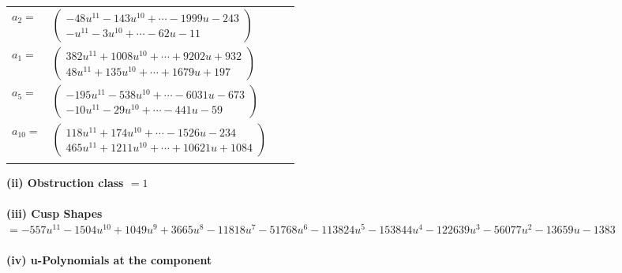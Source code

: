 \documentclass[1p]{elsarticle_modified}
\theoremstyle{definition}
\begin{document}
\begin{tabular}{m{7pt} m{180pt} m{7pt} m{180pt} }
\flushright $a_{2}=$&$\begin{pmatrix}-48 u^{11}-143 u^{10}+\cdots-1999 u-243\\- u^{11}-3 u^{10}+\cdots-62 u-11\end{pmatrix}$ \\
\flushright $a_{1}=$&$\begin{pmatrix}382 u^{11}+1008 u^{10}+\cdots+9202 u+932\\48 u^{11}+135 u^{10}+\cdots+1679 u+197\end{pmatrix}$ \\
\flushright $a_{5}=$&$\begin{pmatrix}-195 u^{11}-538 u^{10}+\cdots-6031 u-673\\-10 u^{11}-29 u^{10}+\cdots-441 u-59\end{pmatrix}$ \\
\flushright $a_{10}=$&$\begin{pmatrix}118 u^{11}+174 u^{10}+\cdots-1526 u-234\\465 u^{11}+1211 u^{10}+\cdots+10621 u+1084\end{pmatrix}$\\&\end{tabular}
\flushleft \textbf{(ii) Obstruction class $= 1$}\\~\\
\flushleft \textbf{(iii) Cusp Shapes $= -557 u^{11}-1504 u^{10}+1049 u^9+3665 u^8-11818 u^7-51768 u^6-113824 u^5-153844 u^4-122639 u^3-56077 u^2-13659 u-1383$}\\~\\
\newpage\renewcommand{\arraystretch}{1}
\flushleft \textbf{(iv) u-Polynomials at the component}\newline \\
\end{document}
